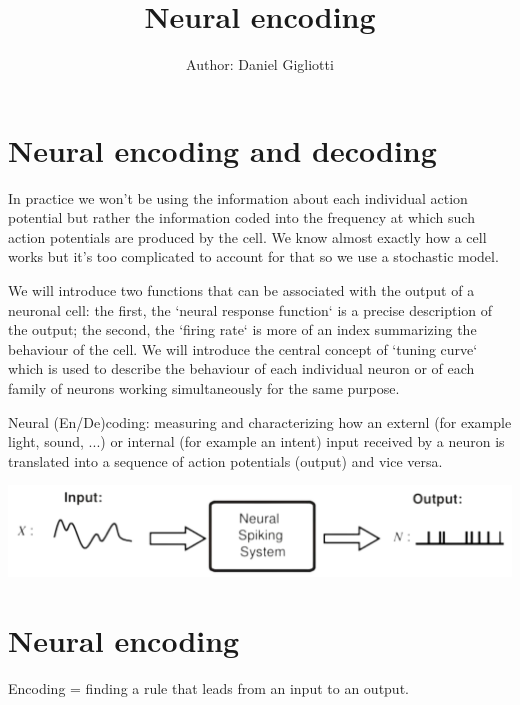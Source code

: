 \documentclass[12pt]{article}
\title{Neural encoding}
\author{Author: Daniel Gigliotti}
\date{}
\begin{document}
\maketitle

\section{Neural encoding and decoding}

In practice we won't be using the information about each individual action potential but rather the information coded into the frequency at which such action potentials are produced by the cell. We know almost exactly how a cell works but it's too complicated to account for that so we use a stochastic model.

\vspace{20px}

We will introduce two functions that can be associated with the output of a neuronal cell: the first, the `neural response function` is a precise description of the output; the second, the `firing rate` is more of an index summarizing the behaviour of the cell. We will introduce the central concept of `tuning curve` which is used to describe the behaviour of each individual neuron or of each family of neurons working simultaneously for the same purpose.

\vspace{20px}

Neural (En/De)coding: measuring and characterizing how an externl (for example light, sound, ...) or internal (for example an intent) input received by a neuron is translated into a sequence of action potentials (output) and vice versa.

\begin{center}
	\includegraphics[scale=0.4]{images/neural_spiking_system.png}
\end{center}

\section{Neural encoding}

\begin{center}
    Encoding = finding a rule that leads from an input to an output.
\end{center}
\end{document}
